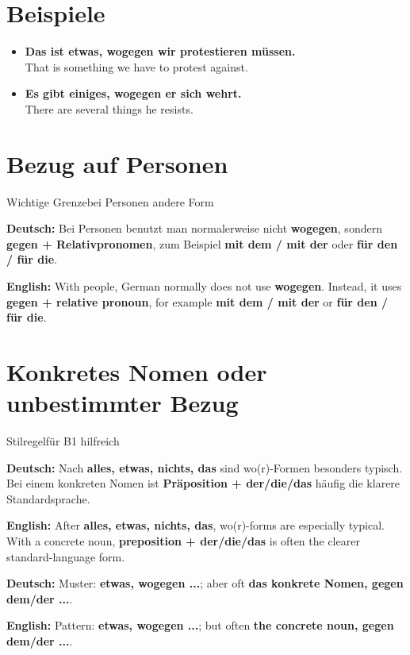 \documentclass[a4paper,11pt]{article}
\newcommand{\GermanText}[1]{\textbf{Deutsch: }#1\par}
\newcommand{\EnglishText}[1]{{\small\color{SoftGray}\textbf{English: }#1\par}}
\newcommand{\ExampleItem}[2]{\item \textbf{#1}\\{\small\color{SoftGray}#2}}
\begin{document}
\section{Beispiele}

\begin{exbox}

\begin{itemize}

\ExampleItem{Das ist etwas, wogegen wir protestieren müssen.}{That is something we have to protest against.}

\ExampleItem{Es gibt einiges, wogegen er sich wehrt.}{There are several things he resists.}

\end{itemize}

\end{exbox}

\section{Bezug auf Personen}

\begin{grammarentry}{Wichtige Grenze}{bei Personen andere Form}

\GermanText{Bei Personen benutzt man normalerweise nicht \textbf{wogegen}, sondern \textbf{gegen + Relativpronomen}, zum Beispiel \textbf{mit dem / mit der} oder \textbf{für den / für die}.}

\EnglishText{With people, German normally does not use \textbf{wogegen}. Instead, it uses \textbf{gegen + relative pronoun}, for example \textbf{mit dem / mit der} or \textbf{für den / für die}.}

\end{grammarentry}

\section{Konkretes Nomen oder unbestimmter Bezug}

\begin{grammarentry}{Stilregel}{für B1 hilfreich}

\GermanText{Nach \textbf{alles, etwas, nichts, das} sind wo(r)-Formen besonders typisch. Bei einem konkreten Nomen ist \textbf{Präposition + der/die/das} häufig die klarere Standardsprache.}

\EnglishText{After \textbf{alles, etwas, nichts, das}, wo(r)-forms are especially typical. With a concrete noun, \textbf{preposition + der/die/das} is often the clearer standard-language form.}

\GermanText{Muster: \textbf{etwas, wogegen ...}; aber oft \textbf{das konkrete Nomen, gegen dem/der ...}.}

\EnglishText{Pattern: \textbf{etwas, wogegen ...}; but often \textbf{the concrete noun, gegen dem/der ...}.}

\end{grammarentry}
\end{document}
